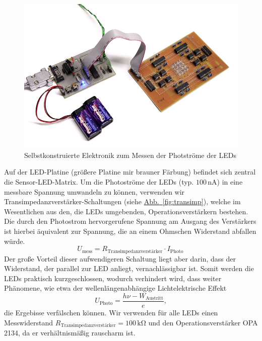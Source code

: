 \documentclass[11pt]{scrartcl}
\newcommand{\unit}[1]{\ensuremath{\,\mathrm{#1}}} %
\newcommand{\hypref}[2]{\hyperref[#2]{{#1}~\ref{#2}}}
\begin{document}
\begin{figure}[ht]
\begin{center}
\includegraphics[width=1.\textwidth]{platinen.jpg}
\end{center}
\vspace{-1.5\baselineskip}
\caption{Selbstkonstruierte Elektronik zum Messen der Photströme der LEDs}
\label{fig:electronics}
\end{figure}

Auf der LED-Platine (größere Platine mir brauner Färbung) befindet sich zentral die Sensor-LED-Matrix.
Um die Photoströme der LEDs (typ. $100 \unit{nA}$) in eine messbare Spannung umwandeln zu können, verwenden wir Transimpedanzverstärker-Schaltungen (siehe \hypref{Abb.}{fig:transimp}), welche im Wesentlichen aus den, die LEDs umgebenden, Operationsverstärkern bestehen.
Die durch den Photostrom hervorgerufene Spannung am Ausgang des Verstärkers ist hierbei äquivalent zur Spannung, die an einem Ohmschen Widerstand abfallen würde.
\begin{equation*}
U_{\text{mess}} = R_{\text{Transimpedanzverstärker}} \cdot I_{\text{Photo}}\,
\end{equation*}
Der große Vorteil dieser aufwendigeren Schaltung liegt aber darin, dass der Widerstand, der parallel zur LED anliegt, vernachlässigbar ist. Somit werden die LEDs praktisch kurzgeschlossen, wodurch verhindert wird, dass weiter Phänomene, wie etwa der wellenlängenabhängige Lichtelektrische Effekt
\begin{equation*}
U_{\text{Photo}} = \frac {h \nu - W_{\text{Austritt}}} {e},
\end{equation*}
die Ergebisse verfälschen können. Wir verwenden für alle LEDs einen Messwiderstand $R_{\text{Transimpedanzverstärker}} = 100 \unit{k \Omega}$ und den Operationsverstärker OPA 2134, da er verhältnismäßig rauscharm ist. 
\end{document}
